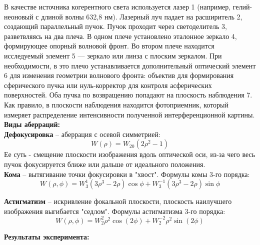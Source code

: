 \documentclass[a4paper, 12pt]{article}%
\begin{document}
	В качестве источника когерентного света используется лазер 1 (например,
	гелий-неоновый с длиной волны 632,8 нм). Лазерный луч падает на расширитель 2, создающий параллельный пучок. Пучок проходит через светоделитель
	3, разветвляясь на два плеча. В одном плече установлено эталонное зеркало 4,
	формирующее опорный волновой фронт. Во втором плече находится исследуемый элемент 5 — зеркало или линза с плоским зеркалом. При необходимости,
	в это плечо устанавливается дополнительный оптический элемент 6 для изменения геометрии волнового фронта: объектив для формирования сферического
	пучка или нуль-корректор для контроля асферических поверхностей. Оба пучка по возвращению попадают на плоскость наблюдения 7. Как правило, в плоскости наблюдения находится фотоприемник, который измеряет распределение
	интенсивности полученной интерференционной картины.\\
	
	\textbf{Виды аберраций:} \\
	
	\textbf{Дефокусировка} – аберрация с осевой симметрией:
	$$W(\rho) = W_{20}(2\rho^2 - 1)$$
	Ее суть - смещение плоскости изображения вдоль оптической оси, из-за чего
	весь пучок фокусируется ближе или дальше от идеального положения.\\
	
	\textbf{Кома} – вытягивание точки фокусировки в "хвост". Формулы комы 3-го
	порядка:
	$$ W(\rho, \phi) = W^1_{3}(3\rho^3 - 2\rho)\cos\phi + W^{-1}_{3}(3\rho^3 - 2\rho)\sin\phi $$
	
	\textbf{Астигматизм} – искривление фокальной плоскости, плоскость наилучшего
	изображения выгибается "седлом". Формулы астигматизма 3-го порядка:
	$$W(\rho, \phi) = W^2_2 \rho^2 \cos(2\phi) + W^{-2}_2 \rho^2 \sin(2\phi) $$
	
	\newpage
	\textbf{Результаты эксперимента: }\\
	
\end{document}
